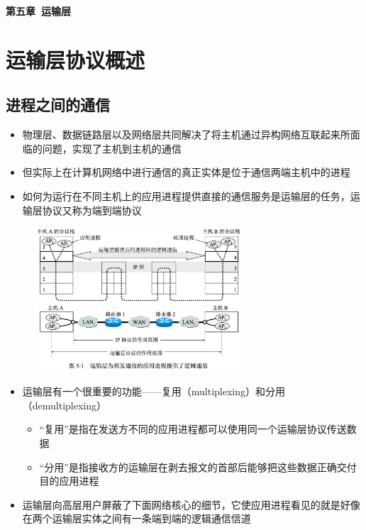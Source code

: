 \documentclass[cs4size,a4paper,10pt]{ctexart}
\begin{document}
	\begin{center}
		{\huge\textbf{第五章\ 运输层}}
	\end{center}
	\tableofcontents
	\clearpage

	\setcounter{page}{1}
	\setlength{\parskip}{0.65em}

	\section{运输层协议概述}

	\subsection{进程之间的通信}

	\begin{itemize}
		\item 物理层、数据链路层以及网络层共同解决了将主机通过异构网络互联起来所面临的问题，实现了主机到主机的通信
		\item 但实际上在计算机网络中进行通信的真正实体是位于通信两端主机中的进程
		\item 如何为运行在不同主机上的应用进程提供直接的通信服务是运输层的任务，运输层协议又称为端到端协议
	\end{itemize}

	\begin{figure}[H]
		\centering
		\includegraphics[width=0.7\textwidth]{img/5.1}
	\end{figure}

	\begin{itemize}
		\item 运输层有一个很重要的功能——复用（multiplexing）和分用（demultiplexing）
		\begin{itemize}
			\item “复用”是指在发送方不同的应用进程都可以使用同一个运输层协议传送数据
			\item “分用”是指接收方的运输层在剥去报文的首部后能够把这些数据正确交付目的应用进程
		\end{itemize}
		\item 运输层向高层用户屏蔽了下面网络核心的细节，它使应用进程看见的就是好像在两个运输层实体之间有一条端到端的逻辑通信信道
	\end{itemize}
	
\end{document}
